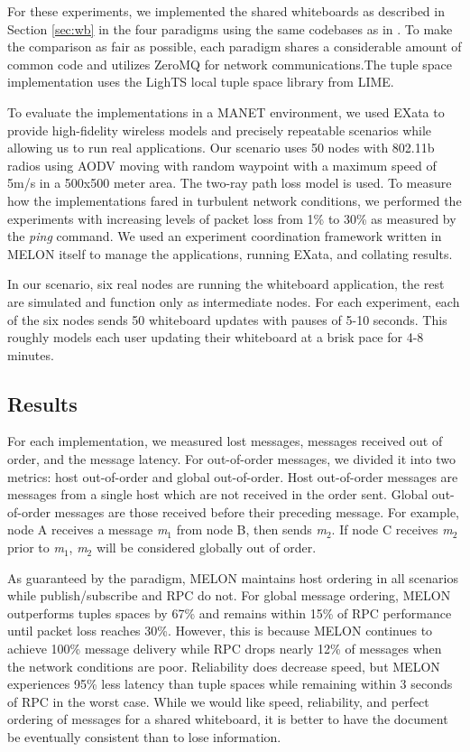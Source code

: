 \documentclass{llncs}
\begin{document}
For these experiments, we implemented the shared whiteboards as described in Section \ref{sec:wb} in the four paradigms using the same codebases as in \cite{melon}. To make the comparison as fair as possible, each paradigm shares a considerable amount of common code and utilizes ZeroMQ for network communications.The tuple space implementation uses the LighTS\cite{lights} local tuple space library from LIME.

To evaluate the implementations in a MANET environment, we used EXata\cite{exata} to provide high-fidelity wireless models and precisely repeatable scenarios while allowing us to run real applications. Our scenario uses 50 nodes with 802.11b radios using AODV moving with random waypoint with a maximum speed of 5m/s in a 500x500 meter area. The two-ray path loss model is used. To measure how the implementations fared in turbulent network conditions, we performed the experiments with increasing levels of packet loss from 1\% to 30\% as measured by the \textit{ping} command. We used an experiment coordination framework written in MELON itself to manage the applications, running EXata, and collating results.

In our scenario, six real nodes are running the whiteboard application, the rest are simulated and function only as intermediate nodes. For each experiment, each of the six nodes sends 50 whiteboard updates with pauses of 5-10 seconds. This roughly models each user updating their whiteboard at a brisk pace for 4-8 minutes.

\subsection{Results}

For each implementation, we measured lost messages, messages received out of order, and the message latency. For out-of-order messages, we divided it into two metrics: host out-of-order and global out-of-order. Host out-of-order messages are messages from a single host which are not received in the order sent. Global out-of-order messages are those received before their preceding message. For example, node A receives a message \textit{m}$_{1}$ from node B, then sends \textit{m}$_{2}$. If node C receives \textit{m}$_{2}$ prior to \textit{m}$_{1}$, \textit{m}$_{2}$ will be considered globally out of order.

As guaranteed by the paradigm, MELON maintains host ordering in all scenarios while publish/subscribe and RPC do not. For global message ordering, MELON outperforms tuples spaces by 67\% and remains within 15\% of RPC performance until packet loss reaches 30\%. However, this is because MELON continues to achieve 100\% message delivery while RPC drops nearly 12\% of messages when the network conditions are poor. Reliability does decrease speed, but MELON experiences 95\% less latency than tuple spaces while remaining within 3 seconds of RPC in the worst case. While we would like speed, reliability, and perfect ordering of messages for a shared whiteboard, it is better to have the document be eventually consistent than to lose information.
\end{document}
